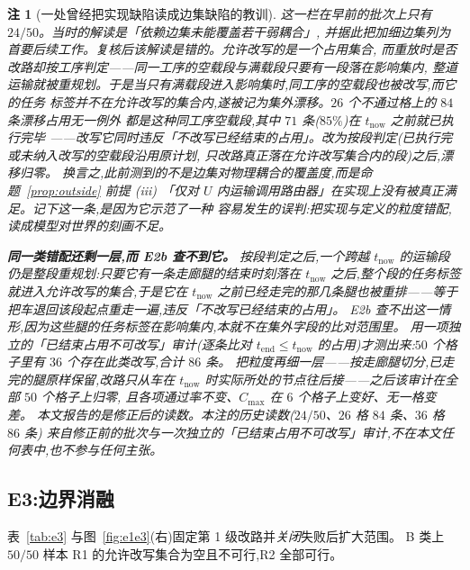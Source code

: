 \documentclass[manuscript,screen,review]{acmart}
\newcommand{\NPairs}{50}
\newtheorem{remark}{注}
\begin{document}
\begin{remark}[一处曾经把实现缺陷读成边集缺陷的教训]
\label{rem:e2b_history}
这一栏在早前的批次上只有 \(24/\NPairs\)。当时的解读是「依赖边集未能覆盖若干弱耦合」,
并据此把加细边集列为首要后续工作。复核后该解读是错的。允许改写的是一个\emph{占用}集合,
而重放时是否改路却按\emph{工序}判定——同一工序的空载段与满载段只要有一段落在影响集内,
整道运输就被重规划。于是当只有满载段进入影响集时,同工序的空载段也被改写,而它的任务
标签并不在允许改写的集合内,遂被记为集外漂移。\(26\) 个不通过格上的 \(84\) 条漂移占用无一例外
都是这种同工序空载段,其中 \(71\) 条(\(85\%\))在 \(t_{\mathrm{now}}\) 之前就已执行完毕
——改写它同时违反「不改写已经结束的占用」。改为按\emph{段}判定(已执行完或未纳入改写的空载段沿用原计划,
只改路真正落在允许改写集合内的段)之后,漂移归零。
换言之,此前测到的不是边集对物理耦合的覆盖度,而是命题~\ref{prop:outside} 前提 (iii)
「仅对 \(U\) 内运输调用路由器」在实现上没有被真正满足。记下这一条,是因为它示范了一种
容易发生的误判:把实现与定义的粒度错配,读成模型对世界的刻画不足。

\textbf{同一类错配还剩一层,而 E2b 查不到它。} 按段判定之后,一个\emph{跨越}
\(t_{\mathrm{now}}\) 的运输段仍是整段重规划:只要它有一条走廊腿的结束时刻落在
\(t_{\mathrm{now}}\) 之后,整个段的任务标签就进入允许改写的集合,于是它在 \(t_{\mathrm{now}}\)
之前\emph{已经走完}的那几条腿也被重排——等于把车退回该段起点重走一遍,违反「不改写已经结束的占用」。
E2b 查不出这一情形,因为这些腿的任务标签在影响集\emph{内},本就不在集外字段的比对范围里。
用一项独立的「已结束占用不可改写」审计(逐条比对 \(t_{\mathrm{end}}\le t_{\mathrm{now}}\)
的占用)才测出来:\(\NPairs\) 个格子里有 \(36\) 个存在此类改写,合计 \(86\) 条。
把粒度再细一层——按\emph{走廊腿}切分,已走完的腿原样保留,改路只从车在
\(t_{\mathrm{now}}\) 时实际所处的节点往后接——之后该审计在全部 \(\NPairs\) 个格子上归零,
且各项通过率不变、\(C_{\max}\) 在 \(6\) 个格子上变好、无一格变差。
本文报告的是修正后的读数。本注的历史读数(\(24/\NPairs\)、\(26\) 格 \(84\) 条、\(36\) 格 \(86\) 条)
来自修正前的批次与一次独立的「已结束占用不可改写」审计,不在本文任何表中,也不参与任何主张。
\end{remark}

\subsection{E3:边界消融}
\label{sec:e3}

表~\ref{tab:e3} 与图~\ref{fig:e1e3}(右)固定第 1 级改路并\emph{关闭}失败后扩大范围。
B 类上 \(\NPairs/\NPairs\) 样本 R1 的允许改写集合为空且不可行,R2 全部可行。
\end{document}
